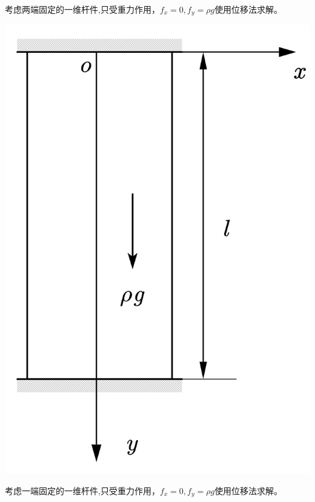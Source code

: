 \begin{example}
	考虑两端固定的一维杆件,只受重力作用，$f_x=0,f_y=\rho g$使用位移法求解。
\end{example}
\centerline{\includegraphics[scale=0.5]{figure/2-8.png}}
\begin{example}
	考虑一端固定的一维杆件,只受重力作用，$f_x=0,f_y=\rho g$使用位移法求解。
\end{example}
